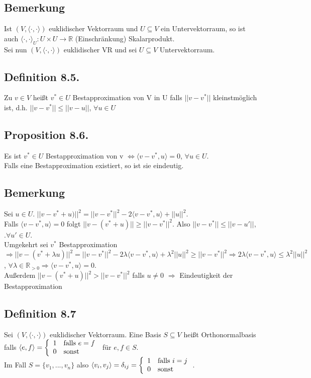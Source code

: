 \documentclass[a4paper, 12pt]{extarticle}
\newcommand{\twopartdef}[4] {
	\left\{
		\begin{array}{ll}
			#1 & #2 \\
			#3 & #4
		\end{array}
	\right.
}
\newcommand{\skalar}[2] {
	\langle #1, #2\rangle
}
\newcommand{\genskalar}{
	\skalar{\cdot }{\cdot }
}
\newcommand{\tn}[1]{\textnormal {#1}}
\begin{document}
\subsection*{Bemerkung}
Ist $(V, \genskalar)$ euklidischer Vektorraum und $U \subseteq V$ ein Untervektorraum, so ist auch $\genskalar_U:U\times U \to \mathbb R$ (Einschränkung) Skalarprodukt. \\
Sei nun $(V, \genskalar)$ euklidischer VR und sei $U \subseteq V$ Untervektorraum.
\subsection*{Definition 8.5.} Zu $v\in V$ heißt $v^*\in U$ Bestapproximation von V in U falls $||v-v^*||$ kleinstmöglich ist, d.h. $||v-v^*|| \leq ||v-u||$, $\forall u \in U$
\subsection*{Proposition 8.6.}
Es ist $v^* \in U$ Bestapproximation von v $\Leftrightarrow \skalar{v-v^*}{u} = 0$, $\forall u \in U$. \\
Falls eine Bestapproximation existiert, so ist sie eindeutig.
\subsection*{Bemerkung}
Sei $u \in U$. $||v-v^*+u)||^2 = || v-v^*||^2-2\skalar{v-v^*}{u} + ||u||^2$. \\
Falls $\skalar{v-v^*}{u} = 0$ folgt $||v-(v^*+u)|| \geq ||v-v^*||^2$. Also $||v-v^*|| \leq ||v-u'||$, $.\forall u'\in U$. \\
Umgekehrt sei $v^*$ Bestapproximation $\Rightarrow ||v-(v^*+\lambda u)||^2 = ||v-v^*||^2-2\lambda\skalar{v-v^*}{u} + \lambda^2||u||^2 \geq ||v-v^*||^2 \Rightarrow 2\lambda\skalar{v-v^*}{u} \leq \lambda^2||u||^2$, $\forall \lambda \in \mathbb R_{>0} \Rightarrow \skalar{v-v^*}{u} = 0$. \\
Außerdem $||v-(v^*+u)||^2 > ||v-v^*||^2$ falls $u \neq 0$ $\Rightarrow$ Eindeutigkeit der Bestapproximation
\subsection*{Definition 8.7} 
Sei $(V, \genskalar)$ euklidischer Vektorraum. Eine Basis $S \subseteq V$ heißt Orthonormalbasis falls $\skalar{e}{f} = \twopartdef{1}{\tn{falls }e = f}{0}{\tn{sonst}}$ für $e,f \in S$. \\
Im Fall $S= \{v_1,...,v_n\}$ also $\skalar{v_i}{v_j} = \delta_{ij} = \twopartdef{1}{\tn{falls } i=j}{0}{\tn{sonst}}$.
\end{document}
